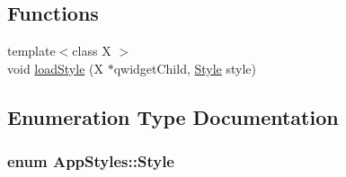 \subsection*{Functions}
\begin{DoxyCompactItemize}
\item 
{\footnotesize template$<$class X $>$ }\\void \hyperlink{namespace_app_styles_a1ca0369de81927bf1f1acd3898d0db0b}{load\-Style} (X $\ast$qwidget\-Child, \hyperlink{namespace_app_styles_a873d94a0142d5e5de96fcc22dc7a71d9}{Style} style)
\end{DoxyCompactItemize}


\subsection{Enumeration Type Documentation}
\hypertarget{namespace_app_styles_a873d94a0142d5e5de96fcc22dc7a71d9}{
\subsubsection[{Style}]{\setlength{\rightskip}{0pt plus 5cm}enum {\bf App\-Styles\-::\-Style}}}\label{namespace_app_styles_a873d94a0142d5e5de96fcc22dc7a71d9}
